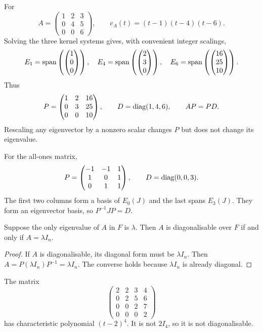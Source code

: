 \begin{example}
For
\[
 A=\begin{pmatrix}1&2&3\\0&4&5\\0&0&6\end{pmatrix},
 \qquad c_A(t)=(t-1)(t-4)(t-6).
\]
Solving the three kernel systems gives, with convenient integer scalings,
\[
 E_1=\operatorname{span}\left(\begin{pmatrix}1\\0\\0\end{pmatrix}\right),\quad
 E_4=\operatorname{span}\left(\begin{pmatrix}2\\3\\0\end{pmatrix}\right),\quad
 E_6=\operatorname{span}\left(\begin{pmatrix}16\\25\\10\end{pmatrix}\right).
\]
Thus
\[
 P=\begin{pmatrix}1&2&16\\0&3&25\\0&0&10\end{pmatrix},\qquad
 D=\operatorname{diag}(1,4,6),\qquad AP=PD.
\]
Rescaling any eigenvector by a nonzero scalar changes $P$ but does not
change its eigenvalue.
\end{example}

\begin{example}
For the all-ones matrix,
\[
 P=\begin{pmatrix}-1&-1&1\\1&0&1\\0&1&1\end{pmatrix},\qquad
 D=\operatorname{diag}(0,0,3).
\]
The first two columns form a basis of $E_0(J)$ and the last spans $E_3(J)$.
They form an eigenvector basis, so $P^{-1}JP=D$.
\end{example}

\begin{proposition}
Suppose the only eigenvalue of $A$ in $F$ is $\lambda$.
Then $A$ is diagonalisable over $F$ if and only if $A=\lambda I_n$.
\end{proposition}
\begin{proof}
If $A$ is diagonalisable, its diagonal form must be $\lambda I_n$.
Then $A=P(\lambda I_n)P^{-1}=\lambda I_n$.
The converse holds because $\lambda I_n$ is already diagonal.
\end{proof}

\begin{example}
The matrix
\[
 \begin{pmatrix}
 2&2&3&4\\0&2&5&6\\0&0&2&7\\0&0&0&2
 \end{pmatrix}
\]
has characteristic polynomial $(t-2)^4$.
It is not $2I_4$, so it is not diagonalisable.
\end{example}
